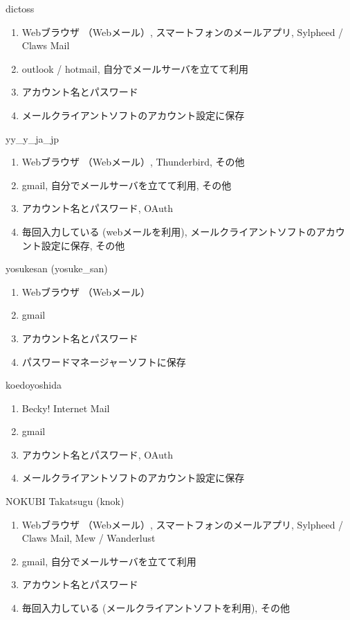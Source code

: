 \begin{prework}{ dictoss }
  \begin{enumerate}
  \item Webブラウザ （Webメール）, スマートフォンのメールアプリ, Sylpheed / Claws Mail
  \item outlook / hotmail, 自分でメールサーバを立てて利用
  \item アカウント名とパスワード
  \item メールクライアントソフトのアカウント設定に保存
  \end{enumerate}
\end{prework}

\begin{prework}{ yy\_y\_ja\_jp }
  \begin{enumerate}
  \item Webブラウザ （Webメール）, Thunderbird, その他
  \item gmail, 自分でメールサーバを立てて利用, その他
  \item アカウント名とパスワード, OAuth
  \item 毎回入力している (webメールを利用), メールクライアントソフトのアカウント設定に保存, その他
  \end{enumerate}
\end{prework}

\begin{prework}{ yosukesan (yosuke\_san) }
  \begin{enumerate}
  \item Webブラウザ （Webメール）
  \item gmail
  \item アカウント名とパスワード
  \item パスワードマネージャーソフトに保存
  \end{enumerate}
\end{prework}

\begin{prework}{ koedoyoshida }
  \begin{enumerate}
  \item Becky! Internet Mail
  \item gmail
  \item アカウント名とパスワード, OAuth
  \item メールクライアントソフトのアカウント設定に保存
  \end{enumerate}
\end{prework}

\begin{prework}{ NOKUBI Takatsugu (knok) }
  \begin{enumerate}
  \item Webブラウザ （Webメール）, スマートフォンのメールアプリ, Sylpheed / Claws Mail, Mew / Wanderlust
  \item gmail, 自分でメールサーバを立てて利用
  \item アカウント名とパスワード
  \item 毎回入力している (メールクライアントソフトを利用), その他
  \end{enumerate}
\end{prework}

